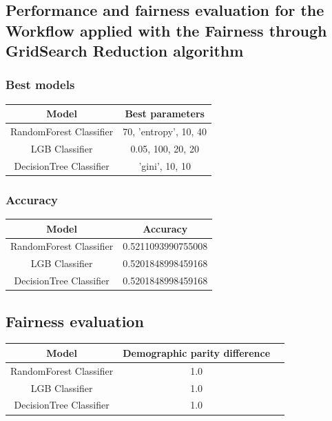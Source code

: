 \documentclass[12pt,a4paper,openright,twoside]{book}
\begin{document}
\subsection{Performance and fairness evaluation for the Workflow applied with the Fairness through GridSearch Reduction algorithm}

\subsubsection{Best models}

\begin{tabular}{|c|c|}
    \hline
    \textbf{Model} & \textbf{Best parameters} \\
    \hline
    RandomForest Classifier  &  {70, 'entropy', 10, 40} \\
    \hline
    LGB Classifier & {0.05, 100, 20, 20} \\
    \hline
    DecisionTree Classifier & {'gini', 10, 10} \\
    \hline
\end{tabular}

\subsubsection{Accuracy}

\begin{tabular}{|c|c|}
    \hline
    \textbf{Model} & \textbf{Accuracy} \\ 
    \hline
    RandomForest Classifier  &  0.5211093990755008\\
    \hline
    LGB Classifier & 0.5201848998459168 \\
    \hline
    DecisionTree Classifier & 0.5201848998459168 \\ 
    \hline
\end{tabular}

\subsection{Fairness evaluation}

\begin{tabular}{|c|c|c|}
    \hline
    \textbf{Model} & \textbf{Demographic parity difference} \\
    \hline
    RandomForest Classifier & 1.0 \\
    \hline
    LGB Classifier & 1.0 \\
    \hline
    DecisionTree Classifier & 1.0 \\
    \hline
\end{tabular}
\end{document}

